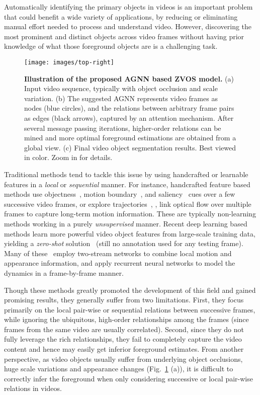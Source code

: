 \documentclass[10pt,twocolumn,letterpaper]{article}
\begin{document}
Automatically identifying the primary objects in videos is an important problem that could benefit
a wide variety of  applications, by
reducing or eliminating manual effort needed to process and understand video.
However, 
discovering the most prominent and distinct
objects across video frames without having prior knowledge of what those
foreground objects are is a challenging task.
\begin{figure}[t]
\centering
      \texttt{[image: images/top-right]}
\vspace{-18pt}
\caption{\textbf{\small Illustration of the proposed AGNN based ZVOS model.} \small (a) Input video sequence, typically with object occlusion and scale variation. (b) The suggested AGNN represents video frames as nodes (blue circles), and the relations between arbitrary frame pairs as edges (black arrows), captured by an attention mechanism. After several message passing iterations, higher-order relations can be mined and more optimal foreground estimations are obtained from a global view. (c) Final video object segmentation results. Best viewed in color. Zoom in for details. }
\label{fig:topright}
\vspace{-15pt}
\end{figure}
Traditional methods tend to tackle this issue by using handcrafted or learnable features in a \textit{local} or \textit{sequential} manner. For instance, handcrafted feature based methods use objectness~\cite{zhang2013}, motion boundary~\cite{DBLP:conf/iccv/PapazoglouF13}, and saliency~\cite{DBLP:conf/cvpr/WangSP15} cues over a few successive video frames, or explore trajectories~\cite{DBLP:conf/iccv/OchsB11}, \ie, link optical flow over multiple frames to capture long-term motion information. These are typically non-learning methods working in a purely \textit{unsupervised} manner. Recent deep learning based methods learn more powerful video object features from large-scale training data, yielding a \textit{zero-shot} solution~\cite{ventura2019rvos}  (still no annotation used for any testing frame). Many of these~\cite{cheng2017segflow,DBLP:conf/cvpr/TokmakovAS17,jain2017fusionseg,DBLP:conf/iccv/TokmakovAS17,Li_2018_ECCV1, Song_2018_ECCV} employ two-stream networks to combine local motion and appearance information, and apply recurrent neural networks to model the dynamics in a frame-by-frame manner.

Though these methods greatly promoted the development of this field and gained promising results, they generally suffer from two limitations. First, they focus primarily on the local pair-wise or sequential relations between successive frames, while ignoring the ubiquitous, high-order relationships among the frames (since frames from the same video are usually correlated). Second, since they do not fully leverage the rich relationships, they fail to completely capture the video content and hence may easily get inferior foreground estimates. From another perspective, as video objects usually suffer from underlying object occlusions, huge scale variations and appearance changes (Fig.~\ref{fig:topright} (a)), it is difficult to correctly infer the foreground when only considering successive or local pair-wise relations in videos.
\end{document}
